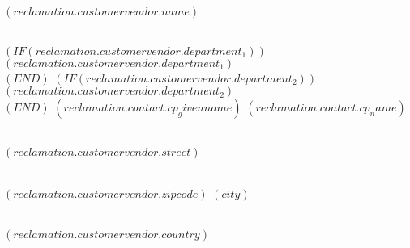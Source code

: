 \documentclass[paper=a4,fontsize=10pt]{scrartcl}
\begin{document}
\begin{letter}{
  $( reclamation.customervendor.name )$\strut\\
  $( IF (reclamation.customervendor.department_1) )$$( reclamation.customervendor.department_1 )$\\$( END )$%
  $( IF (reclamation.customervendor.department_2) )$$( reclamation.customervendor.department_2 )$\\$( END )$%
  $( reclamation.contact.cp_givenname )$ $( reclamation.contact.cp_name )$\strut\\
  $( reclamation.customervendor.street )$\strut\\
  $( reclamation.customervendor.zipcode )$ $( city )$\strut\\
  $( reclamation.customervendor.country )$ \strut
    }

    \opening{
    }
    \thispagestyle{kivitendo.letter.first}

    \vkreklamationsformel


\end{letter}
\end{document}
